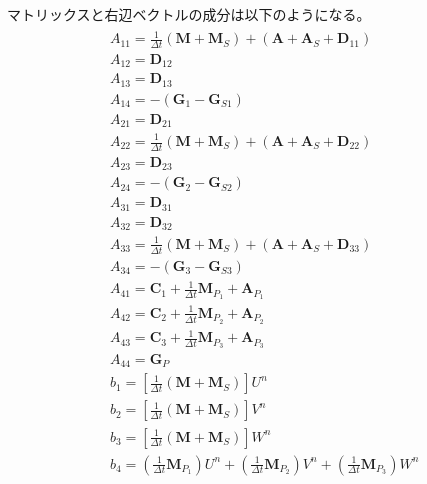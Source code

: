 マトリックスと右辺ベクトルの成分は以下のようになる。
\begin{equation}
	\begin{gathered}
		\begin{aligned} 
			&A_{11} = \frac{1}{\Delta t}\left(\bm{M}+\bm{M}_S\right)+\left(\bm{A}+\bm{A}_S+\bm{D}_{11}\right) \\ 
			&A_{12} = \bm{D}_{12} \\ 
			&A_{13} = \bm{D}_{13} \\
			&A_{14} = -\left(\bm{G}_1-\bm{G}_{S 1}\right) \\
			&A_{21} = \bm{D}_{21} \\ 
			&A_{22} = \frac{1}{\Delta t}\left(\bm{M}+\bm{M}_S\right)+\left(\bm{A}+\bm{A}_S+\bm{D}_{22}\right) \\
			&A_{23} = \bm{D}_{23} \\ 
			&A_{24} = -\left(\bm{G}_2-\bm{G}_{S 2}\right) \\
			&A_{31} = \bm{D}_{31} \\
			&A_{32} = \bm{D}_{32} \\
			&A_{33} = \frac{1}{\Delta t}\left(\bm{M}+\bm{M}_S\right)+\left(\bm{A}+\bm{A}_S+\bm{D}_{33}\right) \\
			&A_{34} = -\left(\bm{G}_3-\bm{G}_{S 3}\right) \\
			&A_{41} = \bm{C}_1+\frac{1}{\Delta t} \bm{M}_{P_1}+\bm{A}_{P_1} \\ 
			&A_{42} = \bm{C}_2+\frac{1}{\Delta t} \bm{M}_{P_2}+\bm{A}_{P_2} \\ 
			&A_{43} = \bm{C}_3+\frac{1}{\Delta t} \bm{M}_{P_3}+\bm{A}_{P_3} \\ 
			&A_{44} = \bm{G}_P \\ 
			&b_1 = \left[\frac{1}{\Delta t}\left(\bm{M}+\bm{M}_S\right)\right] U^n \\
			&b_2 = \left[\frac{1}{\Delta t}\left(\bm{M}+\bm{M}_S\right)\right] V^n \\ 
			&b_3 = \left[\frac{1}{\Delta t}\left(\bm{M}+\bm{M}_S\right)\right] W^n \\ 
			&b_4 = \left(\frac{1}{\Delta t} \bm{M}_{P_1}\right) U^n
			      +\left(\frac{1}{\Delta t} \bm{M}_{P_2}\right) V^n
			      +\left(\frac{1}{\Delta t} \bm{M}_{P_3}\right) W^n
		\end{aligned}
	\end{gathered}
\end{equation}